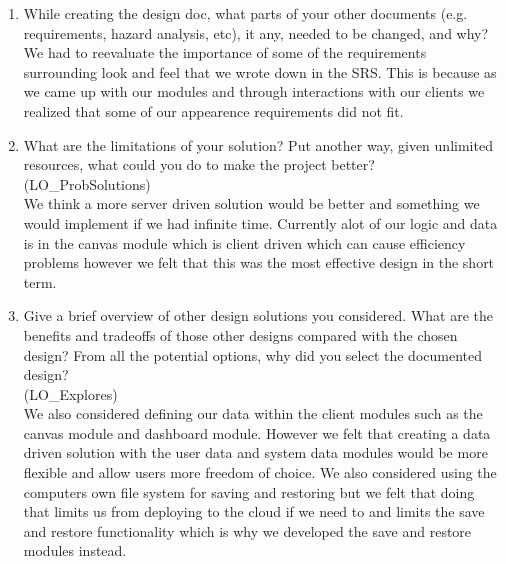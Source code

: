 \documentclass[12pt, titlepage]{article}
\begin{document}
\begin{enumerate}
  \item While creating the design doc, what parts of your other documents (e.g.
  requirements, hazard analysis, etc), it any, needed to be changed, and why? \\
  We had to reevaluate the importance of some of the requirements surrounding look and feel that we wrote down in the SRS. This is because as we came up with our modules and through interactions with our clients we realized that some of our appearence requirements did not fit. 
  \item What are the limitations of your solution?  Put another way, given
  unlimited resources, what could you do to make the project better? 
  (LO\_ProbSolutions) \\
  We think a more server driven solution would be better and something we would implement if we had infinite time. Currently alot of our logic and data is in the canvas module which is client driven which can cause efficiency problems however we felt that this was the most effective design in the short term. 
  \item Give a brief overview of other design solutions you considered.  What
  are the benefits and tradeoffs of those other designs compared with the chosen
  design?  From all the potential options, why did you select the documented design? \\
  (LO\_Explores) \\
  We also considered defining our data within the client modules such as the canvas module and dashboard module. However we felt that creating a data driven solution with the user data and system data modules would be more flexible and allow users more freedom of choice. We also considered using the computers own file system for saving and restoring but we felt that doing that limits us from deploying to the cloud if we need to and limits the save and restore functionality which is why we developed the save and restore modules instead. 

\end{enumerate}
\end{document}
